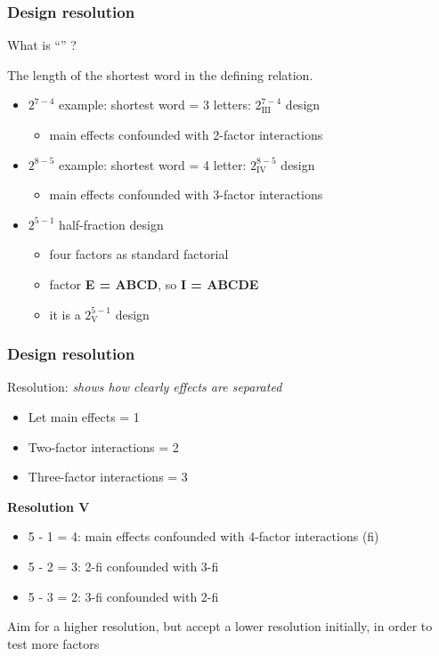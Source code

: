 \begin{frame}\frametitle{Design resolution}
	\begin{block}{What is ``{\color{purple}{Resolution}}'' ?}
		\begin{center}
			The length of the shortest word in the defining relation.
		\end{center}
	\end{block}
	\begin{itemize}
		\item	$2^{7-4}$ example: shortest word = 3 letters: $2^{7-4}_\text{III}$ design
		\begin{itemize}
			\item	main effects confounded with 2-factor interactions
		\end{itemize}
		\item	$2^{8-5}$ example: shortest word = 4 letter: $2^{8-5}_\text{IV}$ design
		\begin{itemize}
			\item	main effects confounded with 3-factor interactions
		\end{itemize}
		\item	$2^{5-1}$ half-fraction design
		\begin{itemize}
			\item	four factors as standard factorial
			\item	factor \textbf{E = ABCD}, so \textbf{I = ABCDE}
			\item	it is a $2^{5-1}_{\text{V}}$ design
		\end{itemize}
	\end{itemize}
\end{frame}

\begin{frame}\frametitle{Design resolution}

	Resolution: \emph{shows how clearly effects are separated}
	\begin{itemize}
		\item	Let main effects = 1
		\item	Two-factor interactions = 2
		\item	Three-factor interactions = 3
	\end{itemize}

	\textbf{Resolution V}
	\begin{itemize}
		\item	5 - 1 = 4: main effects confounded with 4-factor interactions (fi)
		\item	5 - 2 = 3: 2-fi confounded with 3-fi
		\item	5 - 3 = 2: 3-fi confounded with 2-fi
	\end{itemize}

	Aim for a higher resolution, but accept a lower resolution initially, in order to test more factors
\end{frame}

